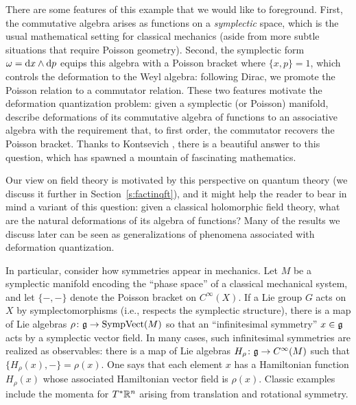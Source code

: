 \documentclass[11pt]{amsart}
\begin{document}
There are some features of this example that we would like to foreground. 
First, the commutative algebra arises as functions on a {\em symplectic} space,
which is the usual mathematical setting for classical mechanics (aside from more subtle situations that require Poisson geometry).
Second, the symplectic form $\omega = {\rm d} x \wedge {\rm d} p$ equips this algebra 
with a Poisson bracket where $\{ x, p \} = 1$,
which controls the deformation to the Weyl algebra: following Dirac, we promote the Poisson relation to a commutator relation.
These two features motivate the deformation quantization problem: 
given a symplectic (or Poisson) manifold,
describe deformations of its commutative algebra of functions to an associative algebra with the requirement that, to first order,  the commutator recovers the Poisson bracket.
Thanks to Kontsevich \cite{KonDQ}, there is a beautiful answer to this question, which has spawned a mountain of fascinating mathematics.

Our view on field theory is motivated by this perspective on quantum theory (we discuss it further in Section~\ref{s:factinqft}), 
and it might help the reader to bear in mind a variant of this question:
given a classical holomorphic field theory, what are the natural deformations of its algebra of functions?
Many of the results we discuss later can be seen as generalizations of phenomena associated with deformation quantization.

In particular, consider how symmetries appear in mechanics.
Let $M$ be a symplectic manifold encoding the ``phase space'' of a classical mechanical system,
and let $\{-,-\}$ denote the Poisson bracket on $C^\infty(X)$.
If a Lie group $G$ acts on $X$ by symplectomorphisms (i.e., respects the symplectic structure),
there is a map of Lie algebras $\rho \colon\mathfrak g \to {\rm SympVect}(M)$ so that an ``infinitesimal symmetry'' $x \in \mathfrak g$ acts by a symplectic vector field.
In many cases, such infinitesimal symmetries are realized as observables: 
there is a map of Lie algebras $H_\rho \colon \mathfrak g \to C^\infty(M)$ such that $\{ H_\rho(x), - \} = \rho(x)$.
One says that each element $x$ has a Hamiltonian function $H_\rho(x)$ whose associated Hamiltonian vector field is $\rho(x)$.
Classic examples include the momenta for $T^* \mathbb R^n$ arising from translation and rotational symmetry.
\end{document}
